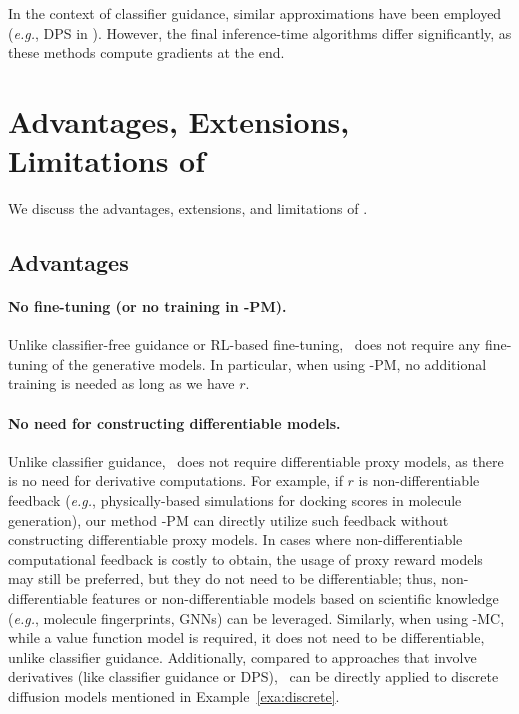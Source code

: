 \begin{remark}
In the context of classifier guidance, similar approximations have been employed (\textit{e.g.}, DPS in \citet{chung2022diffusion}). However, the final inference-time algorithms differ significantly, as these methods compute gradients at the end.
\end{remark}

\vspace{-2mm}
\section{Advantages, Extensions, Limitations of \alg } 
\vspace{-2mm}
We discuss the advantages, extensions, and limitations of \alg.
\vspace{-2mm}
\subsection{Advantages}
\vspace{-2mm}

\paragraph{No fine-tuning (or no training in \alg-PM).} Unlike classifier-free guidance or RL-based fine-tuning, \alg\, does not require any fine-tuning of the generative models. In particular, when using \alg-PM, no additional training is needed as long as we have $r$. 


\vspace{-2mm} 
\paragraph{No need for constructing differentiable models.} Unlike classifier guidance, \alg\, does not require differentiable proxy models, as there is no need for derivative computations. For example, if $r$ is non-differentiable feedback (\textit{e.g.}, physically-based simulations for docking scores in molecule generation), our method \alg-PM can directly utilize such feedback without constructing differentiable proxy models. In cases where non-differentiable computational feedback is costly to obtain, the usage of proxy reward models may still be preferred, but they do not need to be differentiable; thus, non-differentiable features or non-differentiable models based on scientific knowledge (\textit{e.g.}, molecule fingerprints, GNNs) can be leveraged. Similarly, when using \alg-MC, while a value function model is required, it does not need to be differentiable, unlike classifier guidance. Additionally, compared to approaches that involve derivatives (like classifier guidance or DPS), \alg\ can be directly applied to discrete diffusion models mentioned in Example~\ref{exa:discrete}.











